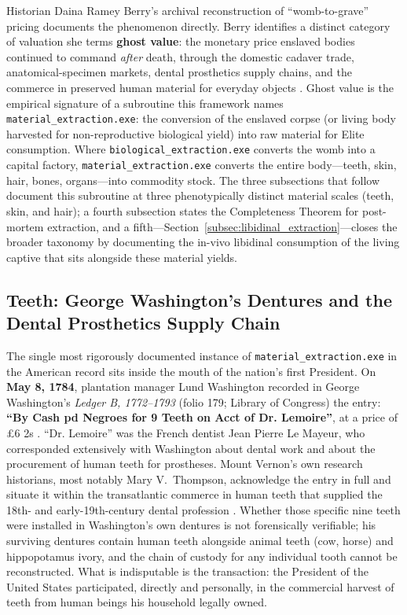 Historian Daina Ramey Berry's archival reconstruction of ``womb-to-grave'' pricing documents the phenomenon directly. Berry identifies a distinct category of valuation she terms \textbf{ghost value}: the monetary price enslaved bodies continued to command \textit{after} death, through the domestic cadaver trade, anatomical-specimen markets, dental prosthetics supply chains, and the commerce in preserved human material for everyday objects \cite{berry_ghost}. Ghost value is the empirical signature of a subroutine this framework names \texttt{material\_extraction.exe}: the conversion of the enslaved corpse (or living body harvested for non-reproductive biological yield) into raw material for Elite consumption. Where \texttt{biological\_extraction.exe} converts the womb into a capital factory, \texttt{material\_extraction.exe} converts the entire body---teeth, skin, hair, bones, organs---into commodity stock. The three subsections that follow document this subroutine at three phenotypically distinct material scales (teeth, skin, and hair); a fourth subsection states the Completeness Theorem for post-mortem extraction, and a fifth---Section~\ref{subsec:libidinal_extraction}---closes the broader taxonomy by documenting the in-vivo libidinal consumption of the living captive that sits alongside these material yields.

\subsection{Teeth: George Washington's Dentures and the Dental Prosthetics Supply Chain}
\label{subsec:teeth}

The single most rigorously documented instance of \texttt{material\_extraction.exe} in the American record sits inside the mouth of the nation's first President. On \textbf{May 8, 1784}, plantation manager Lund Washington recorded in George Washington's \textit{Ledger B, 1772--1793} (folio 179; Library of Congress) the entry: \textbf{``By Cash pd Negroes for 9 Teeth on Acct of Dr. Lemoire''}, at a price of £6 2s \cite{lund_ledger, mv_slave_teeth}. ``Dr. Lemoire'' was the French dentist Jean Pierre Le Mayeur, who corresponded extensively with Washington about dental work and about the procurement of human teeth for prostheses. Mount Vernon's own research historians, most notably Mary V.~Thompson, acknowledge the entry in full and situate it within the transatlantic commerce in human teeth that supplied the 18th- and early-19th-century dental profession \cite{thompson_unavoidable, mv_slave_teeth}. Whether those specific nine teeth were installed in Washington's own dentures is not forensically verifiable; his surviving dentures contain human teeth alongside animal teeth (cow, horse) and hippopotamus ivory, and the chain of custody for any individual tooth cannot be reconstructed. What is indisputable is the transaction: the President of the United States participated, directly and personally, in the commercial harvest of teeth from human beings his household legally owned.

